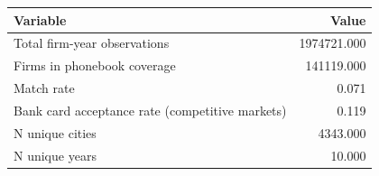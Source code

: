 \begin{tabular}[t]{lr}
\toprule
Variable & Value\\
\midrule
Total firm-year observations & 1974721.000\\
Firms in phonebook coverage & 141119.000\\
Match rate & 0.071\\
Bank card acceptance rate (competitive markets) & 0.119\\
N unique cities & 4343.000\\
\addlinespace
N unique years & 10.000\\
\bottomrule
\end{tabular}
